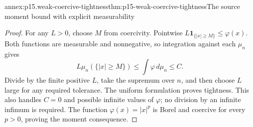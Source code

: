 \begin{annexitem}{annex:p15.weak-coercive-tightness}{thm:p15-weak-coercive-tightness}{The source moment bound with explicit measurability}
\begin{proof}
For any \(L>0\), choose \(M\) from coercivity.
Pointwise \(L\mathbf1_{\{|x|\geq M\}}\leq\varphi(x)\).
Both functions are measurable and nonnegative, so integration
against each \(\mu_n\) gives
\[
 L\mu_n(\{|x|\geq M\})\leq\int\varphi\,d\mu_n\leq C.
\]
Divide by the finite positive \(L\), take the supremum over
\(n\), and then choose \(L\) large for any required tolerance.
The uniform formulation proves tightness. This also handles
\(C=0\) and possible infinite values of \(\varphi\);
no division by an infinite infimum is required.
The function \(\varphi(x)=|x|^p\) is Borel and coercive for
every \(p>0\), proving the moment consequence.
\end{proof}
\end{annexitem}

